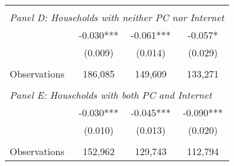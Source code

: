 {\begin{tabular}{lccc}
&  &  &   \\
\multicolumn{4}{l}{\textit{Panel D: Households with neither PC nor Internet}} \\
\hspace{3mm}        &      -0.030***&      -0.061***&      -0.057*  \\
                    &     (0.009)   &     (0.014)   &     (0.029)   \\
                    &               &               &               \\
\hspace{3mm}Observations&     186,085   &     149,609   &     133,271   \\
 
&  &  &   \\
\multicolumn{4}{l}{\textit{Panel E: Households with both PC and Internet}} \\
\hspace{3mm}        &      -0.030***&      -0.045***&      -0.090***\\
                    &     (0.010)   &     (0.013)   &     (0.020)   \\
                    &               &               &               \\
\hspace{3mm}Observations&     152,962   &     129,743   &     112,794   \\
 

\bottomrule
\end{tabular}
}
